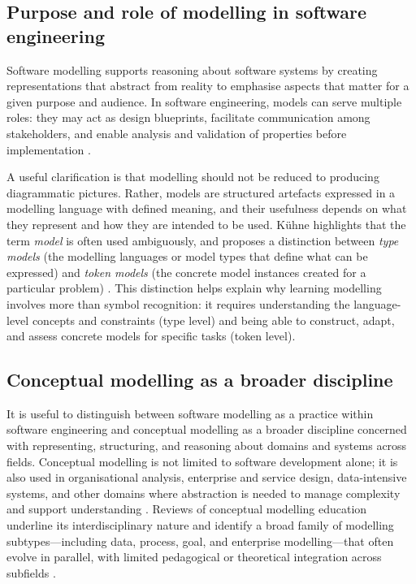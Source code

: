 \subsection{Purpose and role of modelling in software engineering}
\label{subsec:purpose_role_modelling_se}


Software modelling supports reasoning about software systems by creating representations that abstract from reality to emphasise aspects that matter for a given purpose and audience. In software engineering, models can serve multiple roles: they may act as design blueprints, facilitate communication among stakeholders, and enable analysis and validation of properties before implementation \cite{buchmann2019conceptual,maslov2025conceptual}.

A useful clarification is that modelling should not be reduced to producing diagrammatic pictures. Rather, models are structured artefacts expressed in a modelling language with defined meaning, and their usefulness depends on what they represent and how they are intended to be used. Kühne highlights that the term \emph{model} is often used ambiguously, and proposes a distinction between \emph{type models} (the modelling languages or model types that define what can be expressed) and \emph{token models} (the concrete model instances created for a particular problem) \cite{kuhne:DagSemProc.04101.15}. This distinction helps explain why learning modelling involves more than symbol recognition: it requires understanding the language-level concepts and constraints (type level) and being able to construct, adapt, and assess concrete models for specific tasks (token level).

\subsection{Conceptual modelling as a broader discipline}
\label{subsec:conceptual_modelling_broader_discipline}

It is useful to distinguish between software modelling as a practice within software engineering and conceptual modelling as a broader discipline concerned with representing, structuring, and reasoning about domains and systems across fields. Conceptual modelling is not limited to software development alone; it is also used in organisational analysis, enterprise and service design, data-intensive systems, and other domains where abstraction is needed to manage complexity and support understanding \cite{maslov2025conceptual}. Reviews of conceptual modelling education underline its interdisciplinary nature and identify a broad family of modelling subtypes---including data, process, goal, and enterprise modelling---that often evolve in parallel, with limited pedagogical or theoretical integration across subfields \cite{bogdanova2019camelot,bogdanova2017domain,maslov2025conceptual}.

